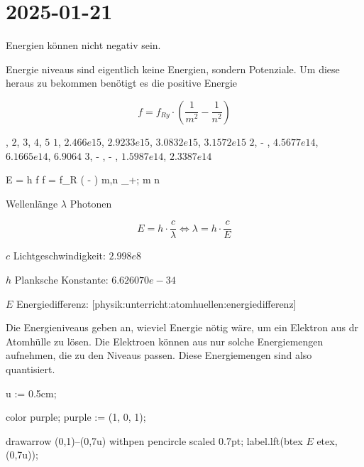 \section{2025-01-21}

\startframedtipp
Energien können nicht negativ sein.

Energie niveaus sind eigentlich keine Energien, sondern Potenziale. Um diese heraus zu bekommen benötigt es die positive Energie
\stopframedtipp

$$
f = f_{Ry} \cdot (\frac{1}{m^2} - \frac{1}{n^2})
$$

\startplacetable[location={here},title={}]
\bTABLE
\startCSV
[background=DiagonalRule] , $2$, $3$, $4$, $5$
$1$, $\unit{2.466e15}$,   $\unit{2.9233e15}$, $\unit{3.0832e15}$, $\unit{3.1572e15}$  
$2$, - , $\unit{4.5677e14}$, $\unit{6.1665e14}$, $\unit{6.9064}$
$3$, - , - , $\unit{1.5987e14}$, $\unit{2.3387e14}$
\stopCSV
\eTABLE
\stopplacetable

\startformula
\startalign
\NC \Delta E = h \cdot f \quad \NC {} \quad f = f_R \cdot ( - ) \NR
\NC \NC m,n \in \naturalnumbers _+; m \lt n \NR
\stopalign
\stopformula
\stopplaceformula

Wellenlänge $\lambda$ Photonen

$$
E = h \cdot \frac{c}{\lambda} \Leftrightarrow \lambda = h \cdot \frac{c}{E}
$$


\startitemize[packed]
\item $c$ Lichtgeschwindigkeit: $\unit{2.998e8}$
\item $h$ Planksche Konstante: $\unit{6.626070e-34}$
\item $E$ Energiedifferenz: [physik:unterricht:atomhuellen:energiedifferenz]
\stopitemize

\startframeddefinition[title={Energieniveaus}]
Die Energieniveaus geben an, wieviel Energie nötig wäre, um  ein Elektron aus
dr Atomhülle zu lösen. Die Elektroen können aus nur solche Energiemengen
aufnehmen, die zu den Niveaus passen. Diese Energiemengen sind also
quantisiert.
\stopframeddefinition


\startMPpage
u := 0.5cm;

color purple;
purple := (1, 0, 1); %

drawarrow (0,1)--(0,7u) withpen pencircle scaled 0.7pt;
label.lft(btex $E$ etex, (0,7u));

